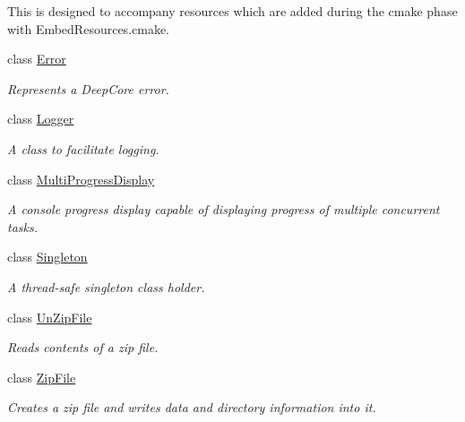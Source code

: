 \begin{DoxyCompactItemize}
\begin{DoxyCompactList}
This is designed to accompany resources which are added during the cmake phase with Embed\+Resources.\+cmake. \end{DoxyCompactList}\item 
class \hyperlink{classdg_1_1deepcore_1_1_error}{Error}
\begin{DoxyCompactList}\small\item\em Represents a Deep\+Core error. \end{DoxyCompactList}\item 
class \hyperlink{classdg_1_1deepcore_1_1_logger}{Logger}
\begin{DoxyCompactList}\small\item\em A class to facilitate logging. \end{DoxyCompactList}\item 
class \hyperlink{classdg_1_1deepcore_1_1_multi_progress_display}{Multi\+Progress\+Display}
\begin{DoxyCompactList}\small\item\em A console progress display capable of displaying progress of multiple concurrent tasks. \end{DoxyCompactList}\item 
class \hyperlink{classdg_1_1deepcore_1_1_singleton}{Singleton}
\begin{DoxyCompactList}\small\item\em A thread-\/safe singleton class holder. \end{DoxyCompactList}\item 
class \hyperlink{classdg_1_1deepcore_1_1_un_zip_file}{Un\+Zip\+File}
\begin{DoxyCompactList}\small\item\em Reads contents of a zip file. \end{DoxyCompactList}\item 
class \hyperlink{classdg_1_1deepcore_1_1_zip_file}{Zip\+File}
\begin{DoxyCompactList}\small\item\em Creates a zip file and writes data and directory information into it. \end{DoxyCompactList}\end{DoxyCompactItemize}
